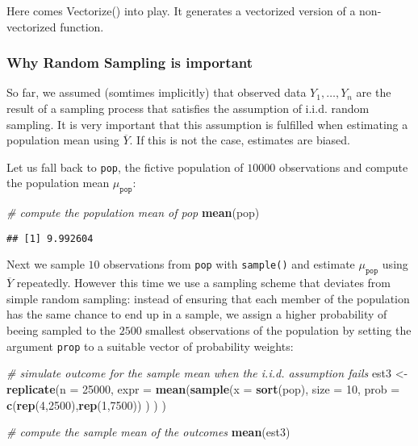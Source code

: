 \documentclass[]{book}
\newenvironment{Shaded}{\begin{snugshade}}{\end{snugshade}}
\newcommand{\KeywordTok}[1]{\textcolor[rgb]{0.13,0.29,0.53}{\textbf{#1}}}
\newcommand{\DataTypeTok}[1]{\textcolor[rgb]{0.13,0.29,0.53}{#1}}
\newcommand{\DecValTok}[1]{\textcolor[rgb]{0.00,0.00,0.81}{#1}}
\newcommand{\StringTok}[1]{\textcolor[rgb]{0.31,0.60,0.02}{#1}}
\newcommand{\CommentTok}[1]{\textcolor[rgb]{0.56,0.35,0.01}{\textit{#1}}}
\newcommand{\NormalTok}[1]{#1}
\theoremstyle{definition}
\theoremstyle{definition}
\theoremstyle{definition}
\theoremstyle{remark}
\begin{document}
Here comes Vectorize() into play. It generates a vectorized version of a
non-vectorized function.

\subsubsection*{Why Random Sampling is
important}\label{why-random-sampling-is-important}

So far, we assumed (somtimes implicitly) that observed data
\(Y_1, \dots, Y_n\) are the result of a sampling process that satisfies
the assumption of i.i.d. random sampling. It is very important that this
assumption is fulfilled when estimating a population mean using
\(\overline{Y}\). If this is not the case, estimates are biased.

Let us fall back to \texttt{pop}, the fictive population of \(10000\)
observations and compute the population mean \(\mu_{\texttt{pop}}\):

\begin{Shaded}
\begin{Highlighting}[]
\CommentTok{# compute the population mean of pop}
\KeywordTok{mean}\NormalTok{(pop)}
\end{Highlighting}
\end{Shaded}

\begin{verbatim}
## [1] 9.992604
\end{verbatim}

Next we sample \(10\) observations from \texttt{pop} with
\texttt{sample()} and estimate \(\mu_{\texttt{pop}}\) using
\(\overline{Y}\) repeatedly. However this time we use a sampling scheme
that deviates from simple random sampling: instead of ensuring that each
member of the population has the same chance to end up in a sample, we
assign a higher probability of beeing sampled to the \(2500\) smallest
observations of the population by setting the argument \texttt{prop} to
a suitable vector of probability weights:

\begin{Shaded}
\begin{Highlighting}[]
\CommentTok{# simulate outcome for the sample mean when the i.i.d. assumption fails}
\NormalTok{est3 <-}\StringTok{  }\KeywordTok{replicate}\NormalTok{(}\DataTypeTok{n =} \DecValTok{25000}\NormalTok{, }
                    \DataTypeTok{expr =} \KeywordTok{mean}\NormalTok{(}\KeywordTok{sample}\NormalTok{(}\DataTypeTok{x =} \KeywordTok{sort}\NormalTok{(pop), }
                                  \DataTypeTok{size =} \DecValTok{10}\NormalTok{, }
                                  \DataTypeTok{prob =} \KeywordTok{c}\NormalTok{(}\KeywordTok{rep}\NormalTok{(}\DecValTok{4}\NormalTok{,}\DecValTok{2500}\NormalTok{),}\KeywordTok{rep}\NormalTok{(}\DecValTok{1}\NormalTok{,}\DecValTok{7500}\NormalTok{))}
\NormalTok{                                      )}
\NormalTok{                                )}
\NormalTok{                   )}

\CommentTok{# compute the sample mean of the outcomes}
\KeywordTok{mean}\NormalTok{(est3)}
\end{Highlighting}
\end{Shaded}
\end{document}
